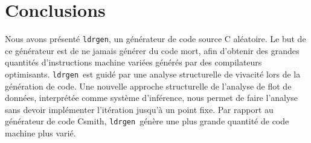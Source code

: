 \documentclass[a4paper]{easychair}
\newcommand\ldrgen{\texttt{ldrgen}}
\begin{document}
\section{Conclusions}

Nous avons présenté \ldrgen, un générateur de code source C aléatoire. Le
but de ce générateur est de ne jamais générer du code mort, afin d'obtenir
des grandes quantités d'instructions machine variées générés par des
compilateurs optimisants.
%
\ldrgen\ est guidé par une analyse structurelle de vivacité lors de la
génération de code. Une nouvelle approche structurelle de l'analyse de flot de données, interprétée comme système d'inférence, nous permet de faire
l'analyse sans devoir implémenter l'itération jusqu'à un point fixe.
%
Par rapport au générateur de code Csmith, \ldrgen\ génère une plus
grande quantité de code machine plus varié.





\end{document}
